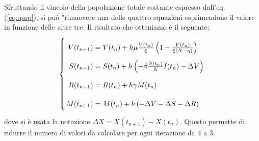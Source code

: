 \documentclass{article}
\begin{document}
Sfruttando il vincolo della popolazione totale costante espresso 
dall'eq. (\ref{eq::pop}), si può "rimuovere una delle quattro 
equazioni esprimendone il valore in funzione delle altre tre.
Il risultato che otteniamo è il seguente:
\begin{equation}\label{eq::ezEvolve}
    \left\{ \arraycolsep=1.4pt\def\arraystretch{2.2}
    \begin{array}{rcl}
    V(t_{n+1}) & = & V(t_n) +h \mu \frac{V(t_n)}{\xi} \left(
        1 - \frac{V(t_n)}{\xi (N - \eta)} \right) \\
    S(t_{n+1}) & = & S(t_n) + h \left(-\beta \frac{S(t_n)}{N} I(t_n)
        - \Delta V \right) \\
    R(t_{n+1}) & = & R(t_n) + h \gamma M(t_n) \\
    M(t_{n+1}) & = & M(t_n) + h \left(-\Delta V - \Delta S - 
        \Delta R\right) \\
    \end{array}\right.
\end{equation}
dove si è usata la notazione $\Delta X = X(t_{n+1})-X(t_n)$. Questo
permette di ridurre il numero di valori da calcolare per ogni 
iterazione da 4 a 3.
\end{document}
